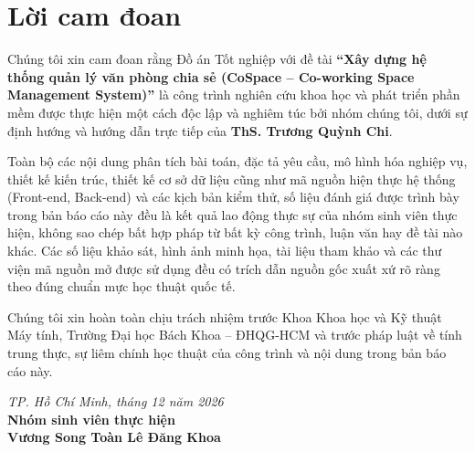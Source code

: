 \chapter*{Lời cam đoan}

Chúng tôi xin cam đoan rằng Đồ án Tốt nghiệp với đề tài \textbf{``Xây dựng hệ thống quản lý văn phòng chia sẻ (CoSpace -- Co-working Space Management System)''} là công trình nghiên cứu khoa học và phát triển phần mềm được thực hiện một cách độc lập và nghiêm túc bởi nhóm chúng tôi, dưới sự định hướng và hướng dẫn trực tiếp của \textbf{ThS. Trương Quỳnh Chi}.

Toàn bộ các nội dung phân tích bài toán, đặc tả yêu cầu, mô hình hóa nghiệp vụ, thiết kế kiến trúc, thiết kế cơ sở dữ liệu cũng như mã nguồn hiện thực hệ thống (Front-end, Back-end) và các kịch bản kiểm thử, số liệu đánh giá được trình bày trong bản báo cáo này đều là kết quả lao động thực sự của nhóm sinh viên thực hiện, không sao chép bất hợp pháp từ bất kỳ công trình, luận văn hay đề tài nào khác. Các số liệu khảo sát, hình ảnh minh họa, tài liệu tham khảo và các thư viện mã nguồn mở được sử dụng đều có trích dẫn nguồn gốc xuất xứ rõ ràng theo đúng chuẩn mực học thuật quốc tế.

Chúng tôi xin hoàn toàn chịu trách nhiệm trước Khoa Khoa học và Kỹ thuật Máy tính, Trường Đại học Bách Khoa -- ĐHQG-HCM và trước pháp luật về tính trung thực, sự liêm chính học thuật của công trình và nội dung trong bản báo cáo này.

\vspace{1.5cm}
\begin{flushright}
\textit{TP. Hồ Chí Minh, tháng 12 năm 2026}\\[0.4cm]
\textbf{Nhóm sinh viên thực hiện}\\[1.5cm]
\textbf{Vương Song Toàn \hspace{1.5cm} Lê Đăng Khoa}
\end{flushright}
